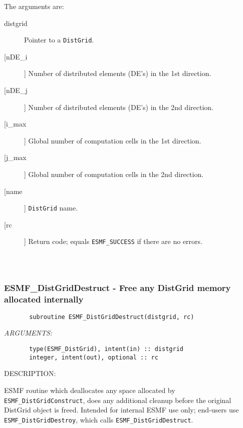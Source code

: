        The arguments are:
       \begin{description}
       \item[distgrid] 
            Pointer to a {\tt DistGrid}.
       \item[[nDE\_i]] 
            Number of distributed elements (DE's) in the 1st direction.
       \item[[nDE\_j]] 
            Number of distributed elements (DE's) in the 2nd direction.
       \item[[i\_max]] 
            Global number of computation cells in the 1st direction.
       \item[[j\_max]] 
            Global number of computation cells in the 2nd direction.
       \item[[name]] 
            {\tt DistGrid} name.
       \item[[rc]] 
            Return code; equals {\tt ESMF\_SUCCESS} if there are no errors.
       \end{description}
  
\begin{verbatim} \end{verbatim}
 
 
\mbox{}\hrulefill\ 
 
\subsubsection{ESMF\_DistGridDestruct - Free any DistGrid memory allocated internally}


\begin{verbatim}       subroutine ESMF_DistGridDestruct(distgrid, rc)\end{verbatim}{\em ARGUMENTS:}
\begin{verbatim}       type(ESMF_DistGrid), intent(in) :: distgrid    
       integer, intent(out), optional :: rc         \end{verbatim}
{\sf DESCRIPTION:\\ }


       ESMF routine which deallocates any space allocated by
      {\tt  ESMF\_DistGridConstruct}, does any additional cleanup before the
       original DistGrid object is freed.  Intended for internal ESMF
       use only; end-users use {\tt ESMF\_DistGridDestroy}, which calls
       {\tt ESMF\_DistGridDestruct}.  
  
